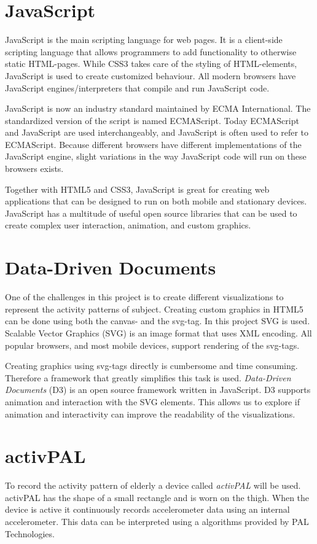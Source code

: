 \section{JavaScript}
JavaScript is the main scripting language for web pages. It is a client-side scripting language that allows programmers to add functionality to otherwise static HTML-pages. While CSS3 takes care of the styling of HTML-elements, JavaScript is used to create customized behaviour. All modern browsers have JavaScript engines/interpreters that compile and run JavaScript code.

JavaScript is now an industry standard maintained by ECMA International. The standardized version of the script is named ECMAScript. Today ECMAScript and JavaScript are used interchangeably, and JavaScript is often used to refer to ECMAScript. Because different browsers have different implementations of the JavaScript engine, slight variations in the way JavaScript code will run on these browsers exists.

Together with HTML5 and CSS3, JavaScript is great for creating web applications that can be designed to run on both mobile and stationary devices. JavaScript has a multitude of useful open source libraries that can be used to create complex user interaction, animation, and custom graphics.

\section{Data-Driven Documents}
One of the challenges in this project is to create different visualizations to represent the activity patterns of subject. Creating custom graphics in HTML5 can be done using both the canvas- and the svg-tag. In this project SVG is used. Scalable Vector Graphics (SVG) is an image format that uses XML encoding. All popular browsers, and most mobile devices, support rendering of the svg-tags.

Creating graphics using svg-tags directly is cumbersome and time consuming. Therefore a framework that greatly simplifies this task is used. \emph{Data-Driven Documents} (D3) is an open source framework written in JavaScript. D3 supports animation and interaction with the SVG elements. This allows us to explore if animation and interactivity can improve the readability of the visualizations.

\section{activPAL}
To record the activity pattern of elderly a device called \emph{activPAL} will be used. activPAL has the shape of a small rectangle and is worn on the thigh. When the device is active it continuously records accelerometer data using an internal accelerometer. This data can be interpreted using a algorithms provided by PAL Technologies.

